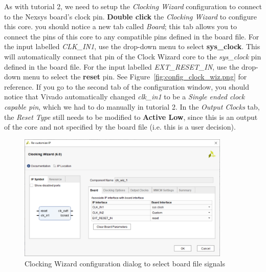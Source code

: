\documentclass[11pt]{article}
\begin{document}
As with tutorial 2, we need to setup the \textit{Clocking Wizard} configuration to connect to the Nexsys board's clock pin. \textbf{Double click} the \textit{Clocking Wizard} to configure this core. you should notice a new tab called \textit{Board}; this tab allows you to connect the pins of this core to any compatible pins defined in the board file. For the input labelled \textit{CLK\_IN1}, use the drop-down menu to select \textbf{sys\_clock}. This will automatically connect that pin of the Clock Wizard core to the \textit{sys\_clock} pin defined in the board file. For the input labelled \textit{EXT\_RESET\_IN}, use the drop-down menu to select the \textbf{reset} pin. See Figure~\ref{fig:config_clock_wiz.png} for reference. If you go to the second tab of the configuration window, you should notice that Vivado automatically changed \textit{clk\_in1} to be a \textit{Single ended clock capable pin}, which we had to do manually in tutorial 2. In the \textit{Output Clocks} tab, the \textit{Reset Type} still needs to be modified to \textbf{Active Low}, since this is an output of the core and not specified by the board file (i.e. this is a user decision).

\begin{figure}[h]
    \centering
    \includegraphics[width=0.9\textwidth]{images/config_clock_wiz.png}
    \caption{Clocking Wizard configuration dialog to select board file signals}
    \label{fig:config_clock_wiz}
\end{figure}
\end{document}
